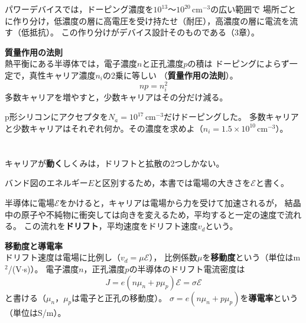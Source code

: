 パワーデバイスでは，ドーピング濃度を$10^{13}$〜$10^{20}\,\mathrm{cm^{-3}}$の広い範囲で
場所ごとに作り分け，低濃度の層に高電圧を受け持たせ（耐圧），高濃度の層に電流を流す（低抵抗）。
この作り分けがデバイス設計そのものである（3章）。

\begin{screen}
\noindent\textbf{質量作用の法則}\\[3pt]
熱平衡にある半導体では，電子濃度$n$と正孔濃度$p$の積は
ドーピングによらず一定で，真性キャリア濃度$n_i$の2乗に等しい
（\textbf{質量作用の法則}）。
\begin{equation}
np = n_i^2
\label{eq2.1}
\end{equation}
多数キャリアを増やすと，少数キャリアはその分だけ減る。
\end{screen}

\begin{問}
\item p形シリコンにアクセプタを$N_a = 10^{17}\,\mathrm{cm^{-3}}$だけドーピングした。
多数キャリアと少数キャリアはそれぞれ何か。その濃度を求めよ（$n_i = 1.5\times10^{10}\,\mathrm{cm^{-3}}$）。
\end{問}

\section{}
\label{sec2.3}

キャリアが\textbf{動く}しくみは，ドリフトと拡散の2つしかない。

\begin{注意}
バンド図のエネルギー$E$と区別するため，本書では電場の大きさを$\mathcal{E}$と書く。
\end{注意}

半導体に電場$\mathcal{E}$をかけると，キャリアは電場から力を受けて加速されるが，
結晶中の原子や不純物に衝突しては向きを変えるため，平均すると一定の速度で流れる。
この流れを\textbf{ドリフト}，平均速度をドリフト速度$v_d$という。

\begin{screen}
\noindent\textbf{移動度と導電率}\\[3pt]
ドリフト速度は電場に比例し（$v_d = \mu\mathcal{E}$），
比例係数$\mu$を\textbf{移動度}という（単位はm$^2$/(V$\cdot$s)）。
電子濃度$n$，正孔濃度$p$の半導体のドリフト電流密度は
\begin{equation}
J = e (n \mu_n + p \mu_p) \mathcal{E} = \sigma \mathcal{E}
\label{eq2.2}
\end{equation}
と書ける（$\mu_n$，$\mu_p$は電子と正孔の移動度）。
$\sigma = e(n\mu_n + p\mu_p)$を\textbf{導電率}という（単位はS/m）。
\end{screen}


